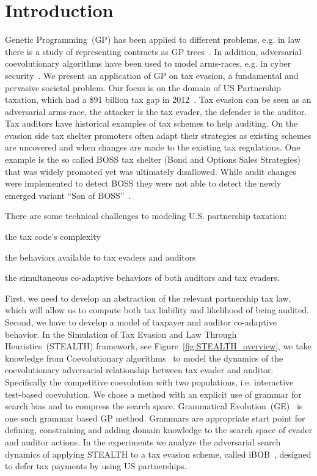 \section{Introduction}

Genetic Programming~(GP) has been applied to different problems,
e.g. in law there is a study of representing contracts as GP
trees~\citep{chandler2007genetically}. In addition, adversarial
coevolutionary algorithms have been used to model arms-races, e.g. in
cyber security~\citep{haddadi2015botnet}. We present an application of
GP on tax evasion, a fundamental and pervasive societal problem. Our
focus is on the domain of US Partnership taxation, which had a \$91
billion tax gap in 2012~\citep{gao2014}. Tax evasion can be seen as an
adversarial arms-race, the attacker is the tax evader, the defender is
the auditor. Tax auditors have historical examples of tax schemes to
help auditing. On the evasion side tax shelter promoters often adapt
their strategies as existing schemes are uncovered and when changes
are made to the existing tax regulations. One example is the so called
BOSS tax shelter (Bond and Options Sales Strategies) that was widely
promoted yet was ultimately disallowed. While audit changes were
implemented to detect BOSS they were not able to detect the newly
emerged variant ``Son of BOSS''~\citep{wright45financial}.

There are some technical challenges to modeling U.S. partnership taxation:
\begin{inparaenum}[\itshape A)]
\item the tax code's complexity
\item the behaviors available to tax evaders and auditors
\item the simultaneous co-adaptive behaviors of both auditors and tax
  evaders.
\end{inparaenum}
First, we need to develop an abstraction of the relevant partnership
tax law, which will allow us to compute both tax liability and
likelihood of being audited. Second, we have to develop a model of
taxpayer and auditor co-adaptive behavior. In the Simulation of Tax
Evasion and Law Through Heuristics~(STEALTH) framework, see
Figure~\ref{fig:STEALTH_overview}, we take knowledge from
Coevolutionary algorithms~\citep{popovici2012coevolutionary} to model
the dynamics of the coevolutionary adversarial relationship between
tax evader and auditor. Specifically the competitive coevolution with
two populations, i.e. interactive test-based coevolution. We chose a
method with an explicit use of grammar for search bias and to compress
the search space. Grammatical Evolution~(GE)~\citep{o2003grammatical}
is one such grammar based GP method. Grammars are appropriate start
point for defining, constraining and adding domain knowledge to the
search space of evader and auditor actions. In the experiments we
analyze the adversarial search dynamics of applying STEALTH to a tax
evasion scheme, called iBOB~\citep{iBOB}, designed to defer tax
payments by using US partnerships.

